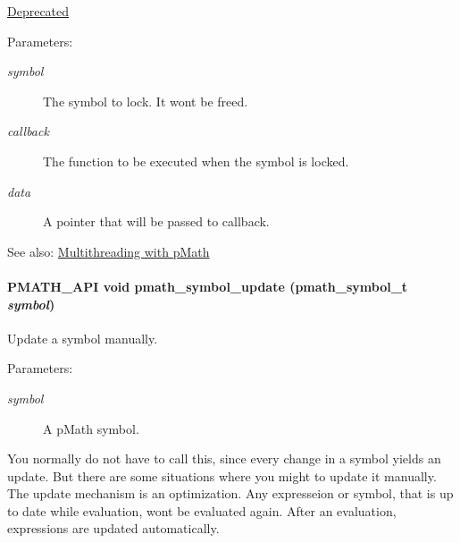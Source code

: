 \begin{Desc}
\item[\hyperlink{deprecated__deprecated000003}{Deprecated}]\end{Desc}
\begin{Desc}
\item[Parameters:]
\begin{description}
\item[{\em symbol}]The symbol to lock. It wont be freed. \item[{\em callback}]The function to be executed when the symbol is locked. \item[{\em data}]A pointer that will be passed to callback.\end{description}
\end{Desc}
\begin{Desc}
\item[See also:]\hyperlink{group__threads}{Multithreading with pMath} \end{Desc}
\hypertarget{group__symbols_g7cd56e2b77ac13a11f1b6f7fd13ba357}{
\paragraph[{pmath\_\-symbol\_\-update}]{\setlength{\rightskip}{0pt plus 5cm}PMATH\_\-API void pmath\_\-symbol\_\-update ({\bf pmath\_\-symbol\_\-t} {\em symbol})}\hfill}
\label{group__symbols_g7cd56e2b77ac13a11f1b6f7fd13ba357}


Update a symbol manually. 

\begin{Desc}
\item[Parameters:]
\begin{description}
\item[{\em symbol}]A pMath symbol.\end{description}
\end{Desc}
You normally do not have to call this, since every change in a symbol yields an update. But there are some situations where you might to update it manually. The update mechanism is an optimization. Any expresseion or symbol, that is up to date while evaluation, wont be evaluated again. After an evaluation, expressions are updated automatically. 